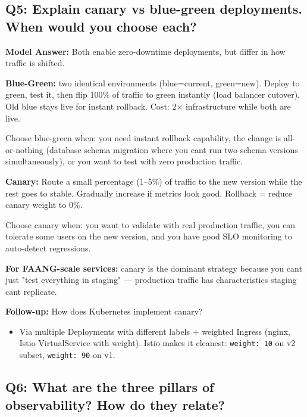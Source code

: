 \documentclass[11pt]{article}
\providecommand{\tightlist}{\setlength{\itemsep}{1pt}\setlength{\parskip}{0pt}}
\begin{document}
\subsection{Q5: Explain canary vs blue-green deployments. When would you choose each?}\label{q5-explain-canary-vs-blue-green-deployments-when-would-you-choose-each}

\textbf{Model Answer:}
Both enable zero-downtime deployments, but differ in how traffic is shifted.

\textbf{Blue-Green:} two identical environments (blue=current, green=new). Deploy to green, test it, then flip 100\% of traffic to green instantly (load balancer cutover). Old blue stays live for instant rollback. Cost: 2\(\times\) infrastructure while both are live.

Choose blue-green when: you need instant rollback capability, the change is all-or-nothing (database schema migration where you can\textquotesingle t run two schema versions simultaneously), or you want to test with zero production traffic.

\textbf{Canary:} Route a small percentage (1--5\%) of traffic to the new version while the rest goes to stable. Gradually increase if metrics look good. Rollback = reduce canary weight to 0\%.

Choose canary when: you want to validate with real production traffic, you can tolerate some users on the new version, and you have good SLO monitoring to auto-detect regressions.

\textbf{For FAANG-scale services:} canary is the dominant strategy because you can\textquotesingle t just "test everything in staging" --- production traffic has characteristics staging can\textquotesingle t replicate.

\textbf{Follow-up:} How does Kubernetes implement canary?

\begin{itemize}
\tightlist
\item
  Via multiple Deployments with different labels + weighted Ingress (nginx, Istio VirtualService with weight). Istio makes it cleanest: \texttt{weight:\ 10} on v2 subset, \texttt{weight:\ 90} on v1.
\end{itemize}

\subsection{Q6: What are the three pillars of observability? How do they relate?}\label{q6-what-are-the-three-pillars-of-observability-how-do-they-relate}
\end{document}
